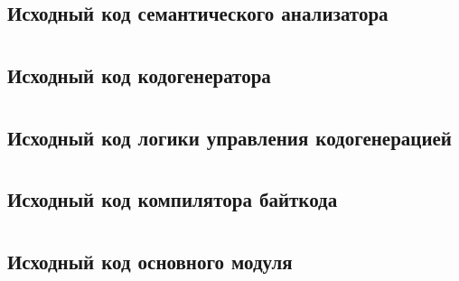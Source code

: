 \documentclass[a4paper,12pt]{article}
\numberwithin{equation}{section}
\begin{document}
\subsection*{Исходный код семантического анализатора}

\clearpage

\section*{}
\subsection*{Исходный код кодогенератора}

\clearpage

\section*{}
\subsection*{Исходный код логики управления кодогенерацией}

\clearpage

\section*{}
\subsection*{Исходный код компилятора байткода}

\clearpage

\section*{}
\subsection*{Исходный код основного модуля}

\clearpage
\end{document}
